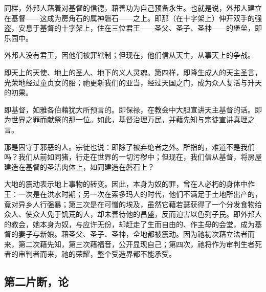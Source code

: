 同样，外邦人藉着对基督的信德，藉善功为自己预备永生。也就是说，外邦人建立在基督——这成为房角石的属神磐石——之上。即那（在十字架上）伸开双手的强盗，安息于基督的十字架上，住在三位君王——圣父、圣子、圣神——的堡垒，即乐园中。\par

外邦人没有君王，因他们被罪辖制；但现在，他们信从天主，从事天上的争战。\par

即天上的天使、地上的圣人、地下的义人灵魂。第四样，即降生成人的天主圣言，光荣地经过童贞女的胎；祂更新我们的亚当，经过天国之门，成为众人复活与升天的初果。\par

即基督，如雅各伯藉犹大所预言的。即保禄，在教会中大胆宣讲天主基督的话。即为世界之罪而献祭的那一位。如此，基督治理万民，并藉先知与宗徒宣讲真理之言。\par

那是固守于邪恶的人。宗徒也说：即除了被弃绝者之外。所指的，难道不是我们吗？我们从前如同猪，行走在世界的一切污秽中；但现在，我们信从基督，将房屋建造在基督的圣洁肉体上，如同建造在磐石上？\par

大地的震动表示地上事物的转变。因此，本身为奴的罪，曾在人必朽的身体中作王：一次是在洪水时期；另一次在索多玛人的时代，他们不满足于土地所出产的，竟对异乡人行强暴；第三次是在可憎的埃及，虽然它藉若瑟获得了一个分发食物给众人、使众人免于饥荒的人，却未善待他的昌盛，反而迫害以色列子民。即外邦人的教会，她本身为奴，与应许无份，却赶走了生而自由的、作主母的会堂，成为基督的妻子与新娘。藉圣父、圣子、圣神，全地都被震动。因为祂初次藉立法者而来，第二次藉先知，第三次藉福音，公开显现自己；第四次，祂将作为审判生者死者的审判者而来，祂的荣耀，整个受造界都不能承受。\par


\subsection{第二片断，论}

